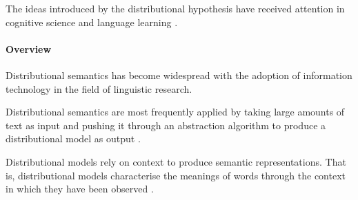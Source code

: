 \documentclass[14pt, a4paper]{extreport}
\begin{document}
The ideas introduced by the distributional hypothesis have received attention in cognitive science \parencite{mcdonald} and language learning \parencite{yarlett}.%

\paragraph{Overview}
Distributional semantics has become widespread with the adoption of information technology in the field of linguistic research.

Distributional semantics are most frequently applied by taking large amounts of text as input and pushing it through an abstraction algorithm to produce a distributional model as output \parencite{emerson}.

Distributional models rely on context to produce semantic representations. That is, distributional models characterise the meanings of words through the context in which they have been observed \parencite{erkkatrin2}.
\end{document}
